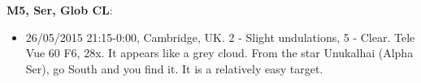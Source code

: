 {\bf M5, Ser, Glob CL}:
\begin{itemize}
\item 26/05/2015 21:15-0:00, Cambridge, UK. 2 - Slight undulations, 5 - Clear. Tele Vue 60 F6, 28x. It appears like a grey cloud. From the star Unukalhai (Alpha Ser), go South and you find it. It is a relatively easy target. 
\end{itemize}
